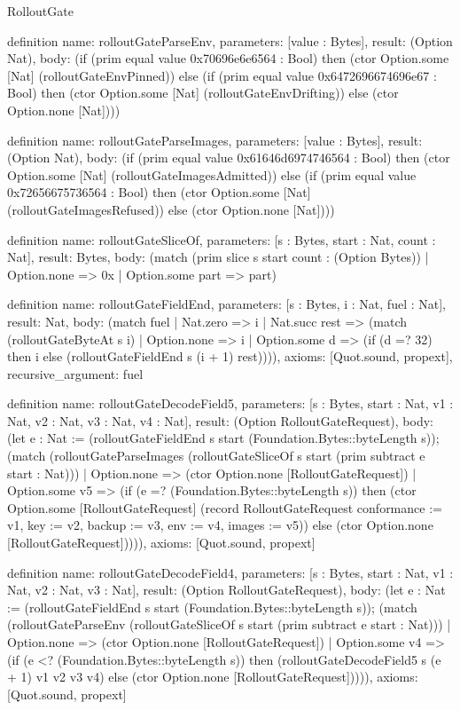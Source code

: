 \begin{lexlean}{RolloutGate}
\begin{semanticmodule}
definition{
  name: rolloutGateParseEnv,
  parameters: [value : Bytes],
  result: (Option Nat),
  body: (if (prim equal value 0x70696e6e6564 : Bool) then (ctor Option.some [Nat] (rolloutGateEnvPinned)) else (if (prim equal value 0x6472696674696e67 : Bool) then (ctor Option.some [Nat] (rolloutGateEnvDrifting)) else (ctor Option.none [Nat])))
}

definition{
  name: rolloutGateParseImages,
  parameters: [value : Bytes],
  result: (Option Nat),
  body: (if (prim equal value 0x61646d6974746564 : Bool) then (ctor Option.some [Nat] (rolloutGateImagesAdmitted)) else (if (prim equal value 0x72656675736564 : Bool) then (ctor Option.some [Nat] (rolloutGateImagesRefused)) else (ctor Option.none [Nat])))
}

definition{
  name: rolloutGateSliceOf,
  parameters: [s : Bytes, start : Nat, count : Nat],
  result: Bytes,
  body: (match (prim slice s start count : (Option Bytes))
    | Option.none => 0x
    | Option.some part => part)
}

definition{
  name: rolloutGateFieldEnd,
  parameters: [s : Bytes, i : Nat, fuel : Nat],
  result: Nat,
  body: (match fuel
    | Nat.zero => i
    | Nat.succ rest => (match (rolloutGateByteAt s i)
      | Option.none => i
      | Option.some d => (if (d =? 32) then i else (rolloutGateFieldEnd s (i + 1) rest)))),
  axioms: [Quot.sound, propext],
  recursive_argument: fuel
}

definition{
  name: rolloutGateDecodeField5,
  parameters: [s : Bytes, start : Nat, v1 : Nat, v2 : Nat, v3 : Nat, v4 : Nat],
  result: (Option RolloutGateRequest),
  body: (let e : Nat := (rolloutGateFieldEnd s start (Foundation.Bytes::byteLength s)); (match (rolloutGateParseImages (rolloutGateSliceOf s start (prim subtract e start : Nat)))
    | Option.none => (ctor Option.none [RolloutGateRequest])
    | Option.some v5 => (if (e =? (Foundation.Bytes::byteLength s)) then (ctor Option.some [RolloutGateRequest] (record RolloutGateRequest {conformance := v1, key := v2, backup := v3, env := v4, images := v5})) else (ctor Option.none [RolloutGateRequest])))),
  axioms: [Quot.sound, propext]
}

definition{
  name: rolloutGateDecodeField4,
  parameters: [s : Bytes, start : Nat, v1 : Nat, v2 : Nat, v3 : Nat],
  result: (Option RolloutGateRequest),
  body: (let e : Nat := (rolloutGateFieldEnd s start (Foundation.Bytes::byteLength s)); (match (rolloutGateParseEnv (rolloutGateSliceOf s start (prim subtract e start : Nat)))
    | Option.none => (ctor Option.none [RolloutGateRequest])
    | Option.some v4 => (if (e <? (Foundation.Bytes::byteLength s)) then (rolloutGateDecodeField5 s (e + 1) v1 v2 v3 v4) else (ctor Option.none [RolloutGateRequest])))),
  axioms: [Quot.sound, propext]
}


\end{semanticmodule}
\end{lexlean}
